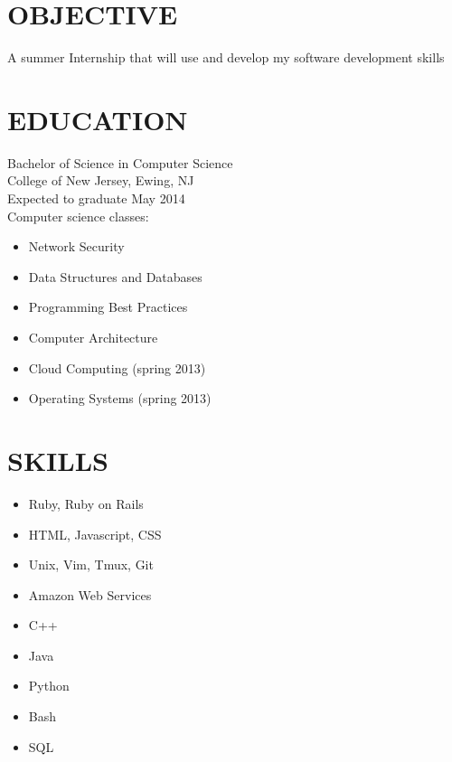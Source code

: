 \documentclass[line, margin]{res}
\begin{document}
  \address{63 Villa Ave.\\ Pitman, NJ 08071\\ (609)-670-5137}
  \begin{resume}
    \section{OBJECTIVE}
    A summer Internship that will use and develop my software development skills
    \section{EDUCATION}
    Bachelor of Science in Computer Science \\
    College of New Jersey, Ewing, NJ \\
    Expected to graduate May 2014 \\
    Computer science classes:
    \begin{multicols}{2}
      \begin{itemize}
          \item Network Security
          \item Data Structures and Databases
          \item Programming Best Practices
          \item Computer Architecture
          \item Cloud Computing (spring 2013)
          \item Operating Systems (spring 2013)
      \end{itemize}
    \end{multicols}
    \section{SKILLS}
    \begin{multicols}{2}
      \begin{itemize}
          \item Ruby, Ruby on Rails
          \item HTML, Javascript, CSS
          \item Unix, Vim, Tmux, Git
          \item Amazon Web Services
          \item C++
          \item Java
          \item Python
          \item Bash
          \item SQL
      \end{itemize}
    \end{multicols}

\end{resume}
\end{document}
